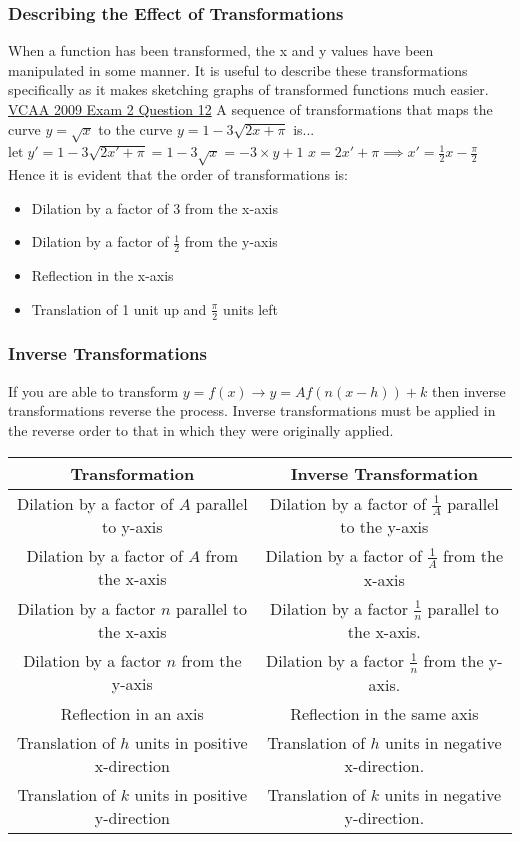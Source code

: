 \documentclass{article}
\begin{document}
			\subsubsection{Describing the Effect of Transformations}
				When a function has been transformed, the x and y values have been manipulated in some manner. It is useful to describe these transformations specifically as it makes sketching graphs of transformed functions much easier.
				\newline\newline
				\underline{VCAA 2009 Exam 2 Question 12}\newline
				A sequence of transformations that maps the curve $y=\sqrt{x}$ to the curve $y=1-3\sqrt{2x+\pi}$ is...\newline
				$\text{let}\; y'=1-3\sqrt{2x'+\pi}=1-3\sqrt{x}=-3\times y + 1$
				$x=2x'+\pi \implies x'=\frac{1}{2}x-\frac{\pi}{2}$
				Hence it is evident that the order of transformations is:
				\begin{itemize}
					\item Dilation by a factor of 3 from the x-axis
					\item Dilation by a factor of $\frac{1}{2}$ from the y-axis
					\item Reflection in the x-axis
					\item Translation of 1 unit up and $\frac{\pi}{2}$ units left
				\end{itemize}
			\newpage
			\subsubsection{Inverse Transformations}
				If you are able to transform $y=f(x)\to y=Af(n(x-h))+k$ then inverse transformations reverse the process. Inverse transformations must be applied in the reverse order to that in which they were originally applied.
				\newline\newline
				\bgroup
				\def\arraystretch{1.5}
				\begin{tabular}{|c|c|}
					\hline
					Transformation & Inverse Transformation \\
					\hline
					Dilation by a factor of $A$ parallel to y-axis & Dilation by a factor of $\frac{1}{A}$ parallel to the y-axis \\
					\hline
					Dilation by a factor of $A$ from the x-axis & Dilation by a factor of $\frac{1}{A}$ from the x-axis \\
					\hline
					Dilation by a factor $n$ parallel to the x-axis & Dilation by a factor $\frac{1}{n}$ parallel to the x-axis. \\
					\hline
					Dilation by a factor $n$ from the y-axis & Dilation by a factor $\frac{1}{n}$ from the y-axis. \\
					\hline
					Reflection in an axis & Reflection in the same axis \\
					\hline
					Translation of $h$ units in positive x-direction & Translation of $h$ units in negative x-direction. \\
					\hline
					Translation of $k$ units in positive y-direction & Translation of $k$ units in negative y-direction. \\
					\hline
				\end{tabular}
				\egroup
\end{document}
